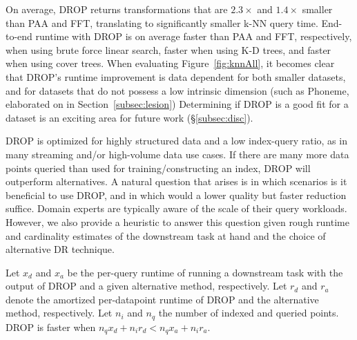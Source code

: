 On average, DROP returns transformations that are $2.3\times$ and  $1.4\times$ smaller than PAA and FFT, translating to significantly smaller k-NN query time. 
End-to-end runtime with DROP is on average  faster than PAA and FFT, respectively, when using brute force linear search,    faster when using K-D trees, and  faster when using cover trees.
When evaluating Figure~\ref{fig:knnAll}, it becomes clear that DROP's runtime improvement is data dependent for both smaller datasets, and for datasets that do not possess a low intrinsic dimension (such as Phoneme, elaborated on in Section~\ref{subsec:lesion})
Determining if DROP is a good fit for a dataset is an exciting area for future work (\S\ref{subsec:disc}).




DROP is optimized for highly structured data and a low index-query ratio, as in many streaming and/or high-volume data use cases.
If there are many more data points queried than used for training/constructing an index, DROP will outperform alternatives. 
A natural question that arises is in which scenarios is it beneficial to use DROP, and in which would a lower quality but faster reduction suffice. 
Domain experts are typically aware of the scale of their query workloads. 
However, we also provide a heuristic to answer this question given rough runtime and cardinality estimates of the downstream task at hand and the choice of alternative DR technique.

Let $x_d$ and $x_a$ be the per-query runtime of running a downstream task with the output of DROP and a given alternative method, respectively. 
Let $r_d$ and $r_a$ denote the amortized per-datapoint runtime of DROP and the alternative method, respectively. 
Let $n_i$ and $n_q$ the number of indexed and queried points. 
DROP is faster when $n_q x_d + n_i r_d < n_q x_a + n_i r_a$.

